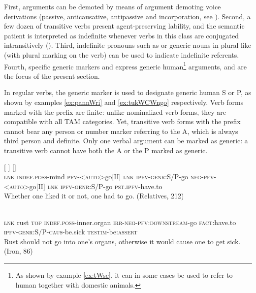 First, arguments can be demoted by means of argument demoting voice derivations (passive, anticausative,  antipassive and incorporation, see \citealt{jacques12incorp, jacques14antipassive}). Second, a few dozen of transitive verbs present agent-preserving lability, and the semantic patient is interpreted as indefinite whenever verbs in this class are conjugated intransitively (\citealt{jacques12demotion}).  Third, indefinite pronouns such as  or generic nouns in plural like  (with plural marking on the verb) can be used to indicate indefinite referents. Fourth,  specific generic markers  and  express generic human\footnote{As shown by example \ref{ex:tWse}, it can in some cases be used to refer to human together with domestic animals.} arguments, and are the focus of the present section. 



In regular verbs, the generic marker  is used to designate generic human S or P, as shown by examples \ref{ex:pannWri} and \ref{ex:tukWCWngo} respectively. Verb forms marked with the prefix  are  finite: unlike nominalized verb forms, they are compatible with all TAM categories. Yet, transitive verb forms with the prefix  cannot bear any person or number marker referring to the A, which is always third person and definite. Only one verbal argument can be marked as generic: a transitive verb cannot have both the A or the P marked as generic.


\begin{exe}
\ex  \label{ex:pannWri}
\gll
{}  	[  	\textbf{}]  	  	  	[\textbf{}]  	  	  	  \\
\textsc{lnk} \textsc{indef.poss}-mind  \textsc{pfv-<auto>}go[II] \textsc{lnk} \textsc{ipfv-genr}:S/P-go \textsc{neg-pfv-<auto>}go[II] \textsc{lnk} \textsc{ipfv-genr}:S/P-go \textsc{pst.ipfv}-have.to \\
\glt Whether one liked it or not, one had to go. (Relatives, 212)
\end{exe}


\begin{exe}
\ex \label{ex:tukWCWngo}
\gll  {} 	 	 	 	 	 	 	 	 \\
\textsc{lnk} rust \textsc{top} \textsc{indef.poss}-inner.organ \textsc{irr-neg-pfv:downstream}-go \textsc{fact}:have.to \textsc{ipfv-genr:S/P-caus}-be.sick  \textsc{testim}-be:\textsc{assert} \\
\glt Rust should not go into one's organs, otherwise it would cause one to get sick. (Iron, 86)
\end{exe}

